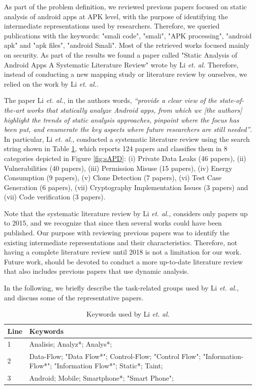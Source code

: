 As part of the problem definition, we reviewed previous papers focused on static analysis of android apps at APK level, with the purpose of identifying the intermediate representations used by researchers. Therefore, we queried publications with  the keywords: "smali code", "smali", "APK processing", "android apk" and "apk files", "android Smali". Most of the retrieved works focused mainly on security. As part of the results we found a paper called "Static Analysis of Android Apps A Systematic Literature Review" \cite{li:IaST2017} wrote by Li \textit{et. al.} Therefore, instead of conducting a new mapping study or literature review by ourselves, we relied on the work by Li \textit{et. al.}.

The paper Li \textit{et. al.}, in the authors words, \textit{``provide a clear view of the state-of-the-art works that statically analyze Android apps, from which we [the authors] highlight the trends of static analysis approaches, pinpoint where the focus has been put, and enumerate the key aspects where future researchers are still needed''}. In particular, Li \textit{et. al.,} conducted a systematic literature review using the search string shown in Table \ref{table:liss}, which reports 124 papers and classifies them in 8 categories depicted in Figure \ref{fig:sAPD}: (i) Private Data Leaks (46 papers), (ii) Vulnerabilities (40 papers), (iii) Permission Misuse (15 papers), (iv) Energy Consumption (9 papers), (v) Clone Detection (7 papers), (vi) Test Case Generation (6 papers), (vii) Cryptography Implementation Issues (3 papers) and (vii) Code verification (3 papers). 

Note that the systematic literature review by Li \textit{et. al.,} considers only papers up to 2015, and we recognize that since then several works could have been published. Our purpose with reviewing previous papers was to identify the existing intermediate representations and their characteristics. Therefore, not having a complete literature review until 2018 is not a limitation for our work.   Future work, should be devoted to conduct a more up-to-date literature review that also includes previous papers that use dynamic analysis.

In the following, we briefly describe the task-related groups used by Li \textit{et. al.,} and discuss some of the representative papers.
\begin{table}[t]
	\centering
		\caption{Keywords used by Li \textit{et. al.}}
	\label{table:liss}
	\begin{tabular}{|p{1cm} | p{10cm}|} 
		\hline
		Line & Keywords \\ [0.5ex] 
		\hline\hline
		1 & Analisis; Analyz*; Analys*; \\ 
		2 & Data-Flow; "Data Flow*"; Control-Flow; "Control Flow"; "Information-Flow*"; "Information Flow*"; Static*; Taint; \\
		3 & Android; Mobile; Smartphone*; "Smart Phone"; \\
		\hline
	\end{tabular}

\end{table}

